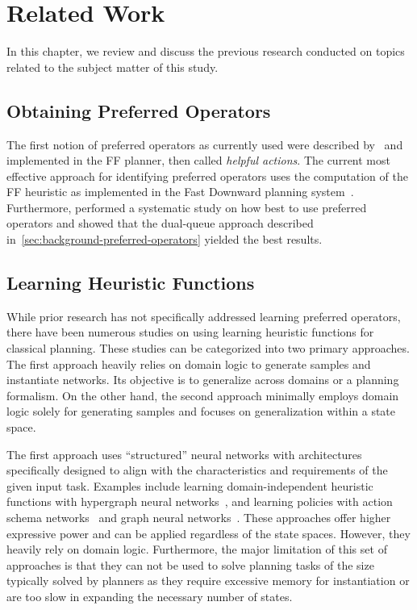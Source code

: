 \documentclass[ppgc,diss,english]{iiufrgs}
\begin{document}
\chapter{Related Work}
In this chapter, we review and discuss the previous research conducted on topics related to the subject matter of this study.

\section{Obtaining Preferred Operators}
The first notion of preferred operators as currently used were described by~\citet{Hoffmann.Nebel/2001} and implemented in the FF planner, then called \emph{helpful actions}. The current most effective approach for identifying preferred operators uses the computation of the FF heuristic as implemented in the Fast Downward planning system~\cite{Helmert/2006}.
Furthermore, \citet{Richter.Helmert/2009} performed a systematic study on how best to use preferred operators and showed that the dual-queue approach described in~\cref{sec:background-preferred-operators} yielded the best results.

\section{Learning Heuristic Functions}
While prior research has not specifically addressed learning preferred operators, there have been numerous studies on using learning heuristic functions for classical planning. These studies can be categorized into two primary approaches.
The first approach heavily relies on domain logic to generate samples and instantiate networks. Its objective is to generalize across domains or a planning formalism.
On the other hand, the second approach minimally employs domain logic solely for generating samples and focuses on generalization within a state space.

The first approach uses ``structured'' neural networks with architectures specifically designed to align with the characteristics and requirements of the given input task. Examples include learning domain-independent heuristic functions with hypergraph neural networks~\cite{Shen.etal/2020}, and learning policies with action schema networks~\cite{Toyer.etal/2018,Toyer.etal/2020} and graph neural networks~\cite{Stahlberg.etal/2022}. These approaches offer higher expressive power and can be applied regardless of the state spaces. However, they heavily rely on domain logic. Furthermore, the major limitation of this set of approaches is that they can not be used to solve planning tasks of the size typically solved by planners as they require excessive memory for instantiation or are too slow in expanding the necessary number of states.
\end{document}

